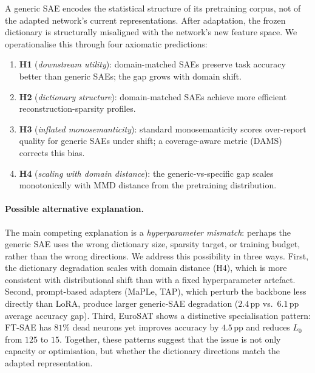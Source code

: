 

A generic SAE encodes the statistical structure of its pretraining corpus, not of the adapted network's current representations. After adaptation, the frozen dictionary is structurally misaligned with the network's new feature space. We operationalise this through four axiomatic predictions:
\begin{enumerate}[leftmargin=5mm,itemsep=-1mm]
\item
\textbf{H1} (\emph{downstream utility}): domain-matched SAEs preserve task accuracy better than generic SAEs; the gap grows with domain shift.
\item
\textbf{H2} (\emph{dictionary structure}): domain-matched SAEs achieve more efficient reconstruction-sparsity profiles.
\item
\textbf{H3} (\emph{inflated monosemanticity}): standard monosemanticity scores over-report quality for generic SAEs under shift; a coverage-aware metric (DAMS) corrects this bias.
\item
\textbf{H4} (\emph{scaling with domain distance}): the generic-vs-specific gap scales monotonically with MMD distance from the pretraining distribution.
\end{enumerate}

\paragraph{Possible alternative explanation.}
The main competing explanation is a \emph{hyperparameter mismatch}: perhaps the generic SAE
uses the wrong dictionary size, sparsity target, or training budget, rather than the wrong
directions. We address this possibility in three ways.
First, the dictionary degradation scales with domain distance (H4), which is more consistent with distributional
shift than with a fixed hyperparameter artefact.
Second, prompt-based adapters (MaPLe, TAP), which perturb the backbone less directly than
LoRA, produce larger generic-SAE degradation ($2.4$\,pp vs.~$6.1$\,pp average accuracy gap).
Third, EuroSAT shows a distinctive specialisation pattern: FT-SAE has $81\%$ dead
neurons yet improves accuracy by $4.5$\,pp and reduces $L_0$ from $125$ to $15$.
Together, these patterns suggest that the issue is not only capacity or optimisation, but
whether the dictionary directions match the adapted representation.

